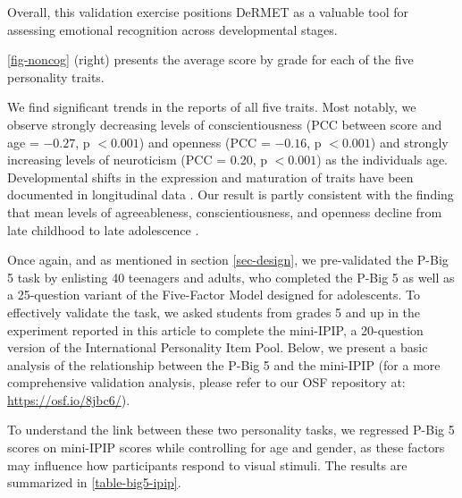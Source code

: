 \documentclass[11pt]{article}
\begin{document}
{Overall, this validation exercise positions DeRMET as a valuable tool for assessing emotional recognition across developmental stages.  \par \bigskip

\par \medskip

\par \medskip

\noindent \autoref{fig-noncog} (right) presents the average score by grade for each of the five personality traits.

  
We find significant trends in the reports of all five traits. Most notably, we observe strongly decreasing levels of conscientiousness (PCC between score and age = $-0.27$, p $<0.001$) and openness (PCC = $-0.16$, p $<0.001$) and strongly increasing levels of neuroticism (PCC = 0.20, p $<0.001$) as the individuals age. Developmental shifts in the expression and maturation of traits have been documented in longitudinal data \citep{tackett2006evaluating}. Our result is partly consistent with the finding that mean levels of agreeableness, conscientiousness, and openness decline from late childhood to late adolescence \citep{soto2015personality}.\par \medskip


\par \medskip

Once again, and as mentioned in section \ref{sec-design}, we pre-validated the P-Big 5 task by enlisting 40 teenagers and adults, who completed the P-Big 5 as well as a 25-question variant of the Five-Factor Model designed for adolescents.  To effectively validate the task, we asked students from grades 5 and up in the experiment reported in this article to complete the mini-IPIP, a 20-question version of the International Personality Item Pool. Below, we present a basic analysis of the relationship between the P-Big 5 and the mini-IPIP (for a more comprehensive validation analysis, please refer to our OSF repository at: \href{https://osf.io/8jbc6/}{https://osf.io/8jbc6/}). 


To understand the link between these two personality tasks, we regressed P-Big 5 scores on mini-IPIP scores while controlling for age and gender, as these factors may influence how participants respond to visual stimuli. The results are summarized in \autoref{table-big5-ipip}. 



}
\end{document}
